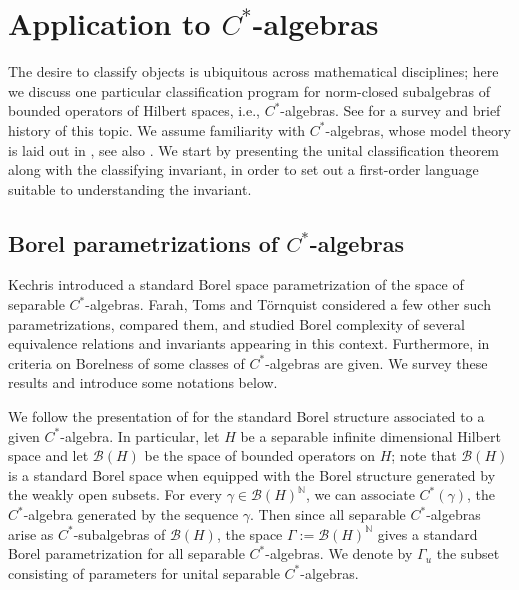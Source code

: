 \documentclass[12pt]{amsart}
\begin{document}
\section{Application to $C^*$-algebras}\label{section: Application}
The desire to classify objects is ubiquitous across mathematical disciplines; here we discuss one particular classification program for norm-closed subalgebras of bounded operators of Hilbert spaces, i.e., $C^*$-algebras. 
See \cite[\S~1.1, \S~1.2]{CGSTW-new-classificationI-2023} for a survey and brief history of this topic. 
We assume familiarity with $C^*$-algebras, whose model theory is laid out in \cite[\S~2.3.1]{farah2014model}, see also \cite{farah2021MTofC*}. 
We start by presenting the unital classification theorem along with the classifying invariant, in order to set out a first-order language suitable to understanding the invariant.

\subsection{Borel parametrizations of $C^*$-algebras}\label{subsec: borel parametrization of C*}

Kechris \cite{Kechrisdescriptivecstar} introduced a standard Borel space parametrization of the space of separable $C^*$-algebras. Farah, Toms and Törnquist \cite{farah2013descriptive, Farahturbulence2014} considered a few other such parametrizations, compared them, and studied Borel complexity of several equivalence relations and invariants appearing in this context. Furthermore, in \cite{farah2021MTofC*} criteria on Borelness of some classes of $C^*$-algebras are given. We survey these results and introduce some notations below.

We follow the presentation of \cite[Section~2.1]{Farahturbulence2014} for the standard Borel structure associated to a given $C^*$-algebra. 
In particular, let $H$ be a separable infinite dimensional Hilbert space and let $\mathcal{B}(H)$ be the space of bounded operators on $H$; note that $\mathcal{B}(H)$ is a standard Borel space when equipped with the Borel structure generated by the weakly open subsets. 
For every $\gamma \in \mathcal{B}(H)^\mathbb{N}$, we can associate $C^*(\gamma)$, the $C^*$-algebra generated by the sequence $\gamma$.
Then since all separable $C^*$-algebras arise as $C^*$-subalgebras of $\mathcal{B}(H)$, the space $\Gamma := \mathcal{B}(H)^\mathbb{N}$ gives a standard Borel parametrization for all separable $C^*$-algebras.
We denote by $\Gamma_u$ the subset consisting of parameters for unital separable $C^*$-algebras.
\end{document}
